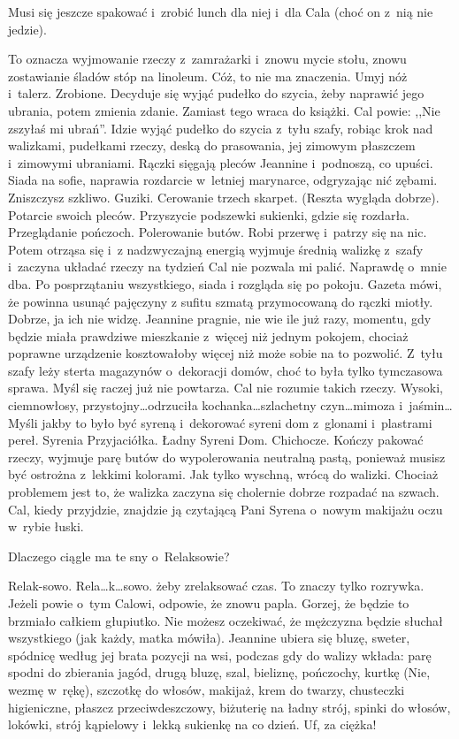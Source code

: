 \documentclass[oneside,polish,12pt,sfheadings]{mwbk}
\begin{document}
Musi się jeszcze spakować i~zrobić lunch dla niej i~dla Cala (choć
on z~nią nie jedzie).

To oznacza wyjmowanie rzeczy z~zamrażarki i~znowu mycie stołu, znowu
zostawianie śladów stóp na linoleum. Cóż, to nie ma znaczenia. Umyj
nóż i~talerz. Zrobione. Decyduje się wyjąć pudełko do szycia, żeby
naprawić jego ubrania, potem zmienia zdanie. Zamiast tego wraca do
książki. Cal powie: ,,Nie zszyłaś mi ubrań''. Idzie wyjąć pudełko do
szycia z~tyłu szafy, robiąc krok nad walizkami, pudełkami rzeczy,
deską do prasowania, jej zimowym płaszczem i~zimowymi ubraniami. Rączki
sięgają pleców Jeannine i~podnoszą, co upuści. Siada na sofie, naprawia
rozdarcie w~letniej marynarce, odgryzając nić zębami. Zniszczysz szkliwo.
Guziki. Cerowanie trzech skarpet. (Reszta wygląda dobrze). Potarcie
swoich pleców. Przyszycie podszewki sukienki, gdzie się rozdarła.
Przeglądanie pończoch. Polerowanie butów. Robi przerwę i~patrzy się
na nic. Potem otrząsa się i~z nadzwyczajną energią wyjmuje średnią
walizkę z~szafy i~zaczyna układać rzeczy na tydzień Cal nie pozwala
mi palić. Naprawdę o~mnie dba. Po posprzątaniu wszystkiego, siada
i rozgląda się po pokoju. Gazeta mówi, że powinna usunąć pajęczyny
z sufitu szmatą przymocowaną do rączki miotły. Dobrze, ja ich nie
widzę. Jeannine pragnie, nie wie ile już razy, momentu, gdy będzie
miała prawdziwe mieszkanie z~więcej niż jednym pokojem, chociaż poprawne
urządzenie kosztowałoby więcej niż może sobie na to pozwolić. Z~tyłu
szafy leży sterta magazynów o~dekoracji domów, choć to była tylko
tymczasowa sprawa. Myśl się raczej już nie powtarza. Cal nie rozumie
takich rzeczy. Wysoki, ciemnowłosy, przystojny\ldots odrzuciła kochanka\ldots szlachetny czyn\ldots mimoza i~jaśmin\ldots Myśli jakby to było być
syreną i~dekorować syreni dom z~glonami i~plastrami pereł. Syrenia
Przyjaciółka. Ładny Syreni Dom. Chichocze. Kończy pakować rzeczy,
wyjmuje parę butów do wypolerowania neutralną pastą, ponieważ musisz
być ostrożna z~lekkimi kolorami. Jak tylko wyschną, wrócą do walizki.
Chociaż problemem jest to, że walizka zaczyna się cholernie dobrze
rozpadać na szwach. Cal, kiedy przyjdzie, znajdzie ją czytającą Pani
Syrena o~nowym makijażu oczu w~rybie łuski.

Dlaczego ciągle ma te sny o~Relaksowie?

Relak-sowo. Rela\ldots k\ldots sowo. żeby zrelaksować czas. To znaczy tylko
rozrywka. Jeżeli powie o~tym Calowi, odpowie, że znowu papla. Gorzej,
że będzie to brzmiało całkiem głupiutko. Nie możesz oczekiwać, że
mężczyzna będzie słuchał wszystkiego (jak każdy, matka mówiła). Jeannine
ubiera się bluzę, sweter, spódnicę według jej brata pozycji na wsi,
podczas gdy do walizy wkłada: parę spodni do zbierania jagód, drugą
bluzę, szal, bieliznę, pończochy, kurtkę (Nie, wezmę w~rękę), szczotkę
do włosów, makijaż, krem do twarzy, chusteczki higieniczne, płaszcz
przeciwdeszczowy, biżuterię na ładny strój, spinki do włosów, lokówki,
strój kąpielowy i~lekką sukienkę na co dzień. Uf, za ciężka!
\end{document}

